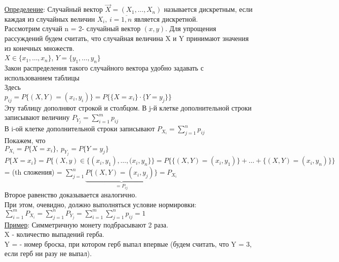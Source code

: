 
\underline{Определение}: Случайный вектор $\vec{X} = (X_1, \ldots , X_n)$ называется дискретным, если каждая из случайных величин $X_i, \ i = \overline{1,n}$ является дискретной. \\

Рассмотрим случай n = 2- случайный вектор $(x,y)$. Для упрощения рассуждений будем считать, что случайная величина X и Y принимают значения из конечных множеств. \\
$X \in \{x_1, \ldots, x_n\}$, $Y = \{y_1, \ldots , y_n\}$ \\
Закон распределения такого случайного вектора удобно задавать с использованием таблицы \\

Здесь \\
$p_{ij} = P\{(X,Y) = (x_i, y_i)\} = P\{ \{X = x_i\} \cdot \{Y = y_j\} \}$ \\ 
Эту таблицу дополняют строкой и столбцом. В j-й клетке дополнительной строки записывают величину $P_{Y_j} = \sum\limits_{i=1}^{m} p_{ij}$ \\
В i-ой клетке дополнительной строки записывают $P_{X_i} = \sum\limits_{j=1}^{n} p_{ij}$ \\
Покажем, что \\
$P_{X_i} = P\{X = x_i\}, \ p_{Y_j} = P\{Y = y_j\}$ \\
$P\{X = x_i\} = P\{(X,y) \in \{(x_i, y_1), \ldots, (x_i, y_n\} \} = P\{ \{(X, Y) = (x_i, y_1)\} + \ldots + \{(X,Y) = (x_i, y_n)\} \}$ = (th сложения) = $\sum\limits_{j = 1}^{n} \underbrace{P\{(X, Y) = (x_i, y_j)\}}_{= P_{ij}} = P_{X_i}$ \\
Второе равенство доказывается аналогично. \\
При этом, очевидно, должно выполняться условие нормировки: \\
$\sum\limits_{i = 1}^{m} P_{X_i} = \sum\limits_{j = 1}^{n} P_{Y_j} = \sum\limits_{i = 1}^{m} \sum\limits_{j = 1}^{n} p_{ij} = 1$ \\

\underline{Пример}: Симметричную монету подбрасывают 2 раза. \\
X - количество выпадений герба. \\
Y = - номер броска, при котором герб выпал впервые (будем считать, что Y = 3, если герб ни разу не выпал). \\

